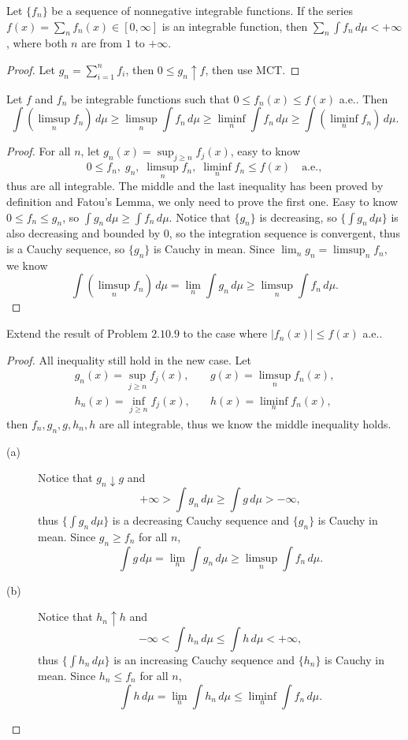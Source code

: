 \begin{pro}%
	Let $\{f_n\}$ be a sequence of nonnegative integrable functions. If the series $f(x)=\sum_n f_n(x)\in[0,\infty]$ is an integrable function, then $\sum_n\int f_n\,d\mu<+\infty$, where both $n$ are from $1$ to $+\infty$.
\end{pro}
\begin{proof}
	Let $g_n=\sum_{i=1}^n f_i$, then $0\leq g_n\uparrow f$, then use MCT.
\end{proof}

\begin{pro}%
	Let $f$ and $f_n$ be integrable functions such that $0\leq f_n(x)\leq f(x)$ a.e.. Then
	\[\int(\limsup_n f_n)\,d\mu\geq \limsup_n \int f_n\,d\mu\geq \liminf_n \int f_n\,d\mu\geq \int(\liminf_n f_n)\,d\mu.\]
\end{pro}
\begin{proof}
	For all $n$, let $g_n(x)=\sup_{j\geq n}f_j(x)$, easy to know 
	\[0\leq f_n,\;g_n,\;\limsup_n f_n,\;\liminf_n f_n\leq f(x)\quad \mbox{a.e.},\]
	thus are all integrable. The middle and the last inequality has been proved by definition and Fatou's Lemma, we only need to prove the first one. Easy to know $0\leq f_n\leq g_n$, so $\int g_n\,d\mu\geq \int f_n\,d\mu$. Notice that $\{g_n\}$ is decreasing, so $\{\int g_n\,d\mu\}$ is also decreasing and bounded by $0$, so the integration sequence is convergent, thus is a Cauchy sequence, so $\{g_n\}$ is Cauchy in mean. Since $\lim_n g_n=\limsup_n f_n$, we know
	\[\int (\limsup_n f_n)\,d\mu=\lim_n \int g_n\,d\mu\geq \limsup_n \int f_n\,d\mu.\]
\end{proof}

\begin{pro}%
	Extend the result of Problem $2.10.9$ to the case where $|f_n(x)|\leq f(x)$ a.e..
\end{pro}
\begin{proof}
	All inequality still hold in the new case. Let
	\begin{align*}
	g_n(x)=\sup_{j\geq n}f_j(x),&\quad g(x)=\limsup_n f_n(x),\\
	h_n(x)=\inf_{j\geq n}f_j(x),&\quad h(x)=\liminf_n f_n(x),
	\end{align*} then $f_n,g_n,g,h_n,h$ are all integrable, thus we know the middle inequality holds.
	\begin{description}
	\item[(a)] Notice that $g_n\downarrow g$ and 
	\[+\infty>\int g_n\,d\mu\geq \int g\,d\mu>-\infty,\]
	thus $\{\int g_n\,d\mu\}$ is a decreasing Cauchy sequence and $\{g_n\}$ is Cauchy in mean. Since $g_n\geq f_n$ for all $n$,
	\[\int g\,d\mu=\lim_n \int g_n\,d\mu \geq \limsup_n \int f_n\,d\mu.\]
	\item[(b)] Notice that $h_n\uparrow h$ and
	\[-\infty<\int h_n\,d\mu\leq \int h\,d\mu<+\infty,\]
	thus $\{\int h_n\,d\mu\}$ is an increasing Cauchy sequence and $\{h_n\}$ is Cauchy in mean. Since $h_n\leq f_n$ for all $n$,
	\[\int h\,d\mu=\lim_n \int h_n\,d\mu \leq \liminf_n \int f_n\,d\mu.\]
	\end{description}
\end{proof}

